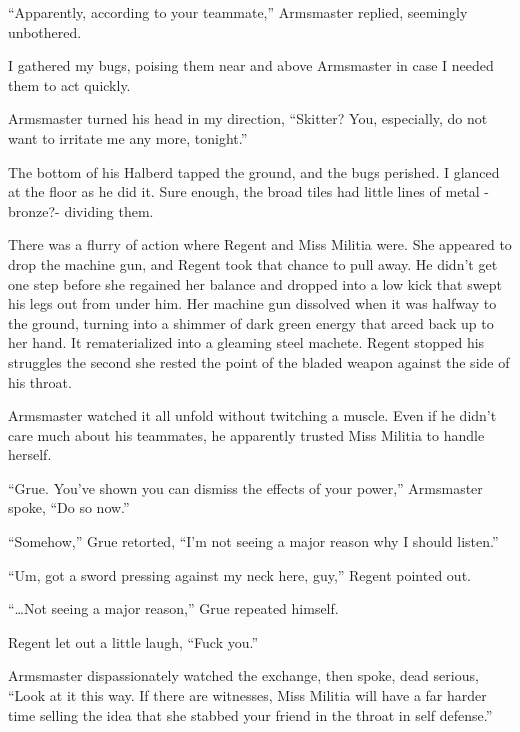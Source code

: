 ``Apparently, according to your teammate,'' Armsmaster replied, seemingly unbothered.



I gathered my bugs, poising them near and above Armsmaster in case I needed them to act quickly.



Armsmaster turned his head in my direction, ``Skitter?  You, especially, do not want to irritate me any more, tonight.''



The bottom of his Halberd tapped the ground, and the bugs perished.  I glanced at the floor as he did it.  Sure enough, the broad tiles had little lines of metal -bronze?- dividing them.



There was a flurry of action where Regent and Miss Militia were.  She appeared to drop the machine gun, and Regent took that chance to pull away.  He didn't get one step before she regained her balance and dropped into a low kick that swept his legs out from under him.  Her machine gun dissolved when it was halfway to the ground, turning into a shimmer of dark green energy that arced back up to her hand.  It rematerialized into a gleaming steel machete.  Regent stopped his struggles the second she rested the point of the bladed weapon against the side of his throat.



Armsmaster watched it all unfold without twitching a muscle.  Even if he didn't care much about his teammates, he apparently trusted Miss Militia to handle herself.



``Grue.  You've shown you can dismiss the effects of your power,'' Armsmaster spoke, ``Do so now.''



``Somehow,'' Grue retorted, ``I'm not seeing a major reason why I should listen.''



``Um, got a sword pressing against my neck here, guy,'' Regent pointed out.



``\ldots{}Not seeing a major reason,'' Grue repeated himself.



Regent let out a little laugh, ``Fuck you.''



Armsmaster dispassionately watched the exchange, then spoke, dead serious, ``Look at it this way.  If there are witnesses, Miss Militia will have a far harder time selling the idea that she stabbed your friend in the throat in self defense.''




